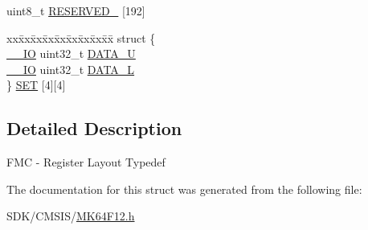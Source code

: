 \begin{DoxyCompactItemize}
\item 
uint8\+\_\+t \mbox{\hyperlink{group___v_r_e_f___peripheral___access___layer_ga2b49646d4f332d1141142fea1e0bd93a}{R\+E\+S\+E\+R\+V\+E\+D\+\_}} \mbox{[}192\mbox{]}
\item 
\begin{tabbing}
xx\=xx\=xx\=xx\=xx\=xx\=xx\=xx\=xx\=\kill
struct \{\\
\>\mbox{\hyperlink{core__cm4_8h_aec43007d9998a0a0e01faede4133d6be}{\_\_IO}} uint32\_t \mbox{\hyperlink{group___v_r_e_f___peripheral___access___layer_ga00388e078eb17507e099f6d133a40b86}{DATA\_U}}\\
\>\mbox{\hyperlink{core__cm4_8h_aec43007d9998a0a0e01faede4133d6be}{\_\_IO}} uint32\_t \mbox{\hyperlink{group___v_r_e_f___peripheral___access___layer_gab7bcabc6d40839653e0a8be3b502df61}{DATA\_L}}\\
\} \mbox{\hyperlink{group___v_r_e_f___peripheral___access___layer_ga43f41cb15ff955816cb40f46ca2000f6}{SET}} \mbox{[}4\mbox{]}\mbox{[}4\mbox{]}\\

\end{tabbing}\end{DoxyCompactItemize}


\subsection{Detailed Description}
F\+MC -\/ Register Layout Typedef 

The documentation for this struct was generated from the following file\+:\begin{DoxyCompactItemize}
\item 
S\+D\+K/\+C\+M\+S\+I\+S/\mbox{\hyperlink{_m_k64_f12_8h}{M\+K64\+F12.\+h}}\end{DoxyCompactItemize}
